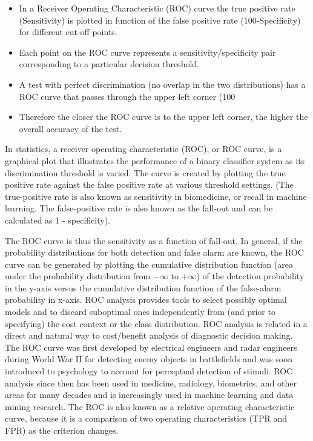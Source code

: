\documentclass[a4paper,12pt]{article}
\begin{document}
\begin{itemize}
	\item  In a Receiver Operating Characteristic (ROC) curve the true positive rate (Sensitivity) is
	plotted in function of the false positive rate (100-Specificity) for different cut-off points.
	\item  Each point on the ROC curve represents a sensitivity/specificity pair corresponding to a
	particular decision threshold.
	
	\item  A test with perfect discrimination (no overlap in the two distributions) has a ROC curve that
	passes through the upper left corner (100%
	\item  Therefore the closer the ROC curve is to the upper left corner, the higher the overall accuracy
	of the test.
	
\end{itemize}
\newpage

In statistics, a receiver operating characteristic (ROC), or ROC curve, is a graphical plot that illustrates the performance of a binary classifier system as its discrimination threshold is varied. The curve is created by plotting the true positive rate against the false positive rate at various threshold settings. (The true-positive rate is also known as sensitivity in biomedicine, or recall in machine learning. The false-positive rate is also known as the fall-out and can be calculated as 1 - specificity). 

The ROC curve is thus the sensitivity as a function of fall-out. In general, if the probability distributions for both detection and false alarm are known, the ROC curve can be generated by plotting the cumulative distribution function (area under the probability distribution from $-\infty$ to $+\infty$) of the detection probability in the y-axis versus the cumulative distribution function of the false-alarm probability in x-axis.
ROC analysis provides tools to select possibly optimal models and to discard suboptimal ones independently from (and prior to specifying) the cost context or the class distribution. ROC analysis is related in a direct and natural way to cost/benefit analysis of diagnostic decision making.
The ROC curve was first developed by electrical engineers and radar engineers during World War II for detecting enemy objects in battlefields and was soon introduced to psychology to account for perceptual detection of stimuli. ROC analysis since then has been used in medicine, radiology, biometrics, and other areas for many decades and is increasingly used in machine learning and data mining research.
The ROC is also known as a relative operating characteristic curve, because it is a comparison of two operating characteristics (TPR and FPR) as the criterion changes.
\end{document}
